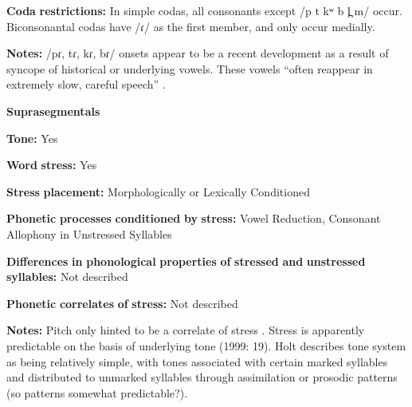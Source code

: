\documentclass[output=paper]{langsci/langscibook}
\begin{document}
\begin{styleBody}
\textbf{Coda} \textbf{restrictions:} In simple codas, all consonants except /p t kʷ b l̪ m/ occur. Biconsonantal codas have /ɾ/ as the first member, and only occur medially.
\end{styleBody}

\begin{styleBody}
\textbf{Notes:} /pɾ, tɾ, kɾ, bɾ/ onsets appear to be a recent development as a result of syncope of historical or underlying vowels. These vowels “often reappear in extremely slow, careful speech” \citep[20]{Holt1999}.
\end{styleBody}

\begin{styleBody}
\textbf{Suprasegmentals}
\end{styleBody}

\begin{styleBody}
\textbf{Tone:} Yes
\end{styleBody}

\begin{styleBody}
\textbf{Word} \textbf{stress:} Yes
\end{styleBody}

\begin{styleBody}
\textbf{Stress} \textbf{placement:} Morphologically or Lexically Conditioned
\end{styleBody}

\begin{styleBody}
\textbf{Phonetic} \textbf{processes} \textbf{conditioned} \textbf{by} \textbf{stress:} Vowel Reduction, Consonant Allophony in Unstressed Syllables
\end{styleBody}

\begin{styleBody}
\textbf{Differences} \textbf{in} \textbf{phonological} \textbf{properties} \textbf{of} \textbf{stressed} \textbf{and} \textbf{unstressed} \textbf{syllables:} Not described
\end{styleBody}

\begin{styleBody}
\textbf{Phonetic} \textbf{correlates} \textbf{of} \textbf{stress:} Not described
\end{styleBody}

\begin{styleBody}
\textbf{Notes:} Pitch only hinted to be a correlate of stress \citep[238]{Holt1986}. Stress is apparently predictable on the basis of underlying tone (1999: 19). Holt describes tone system as being relatively simple, with tones associated with certain marked syllables and distributed to unmarked syllables through assimilation or prosodic patterns (so patterns somewhat predictable?).
\end{styleBody}
\end{document}
